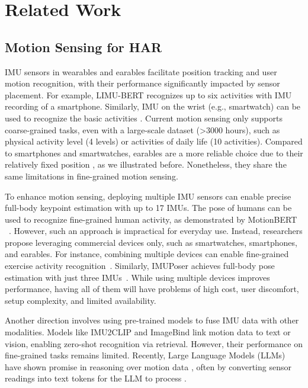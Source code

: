 \section{Related Work}

\label{sec:egolog_related}
\subsection{Motion Sensing for HAR}
IMU sensors in wearables and earables facilitate position tracking and user motion recognition, with their performance significantly impacted by sensor placement.
For example, LIMU-BERT \citep{xu2021limu} recognizes up to six activities with IMU recording of a smartphone.
Similarly, IMU on the wrist (e.g., smartwatch) can be used to recognize the basic activities \citep{chan2024capture}. 
Current motion sensing \citep{chan2024capture} only supports coarse-grained tasks, even with a large-scale dataset (>3000 hours), such as physical activity level (4 levels) or activities of daily life (10 activities).
Compared to smartphones and smartwatches, earables are a more reliable choice due to their relatively fixed position \citep{lyu2024earda, han2023headmon, han2023headsense, han2025headmon+}, as we illustrated before. Nonetheless, they share the same limitations in fine-grained motion sensing.

To enhance motion sensing, deploying multiple IMU sensors can enable precise full-body keypoint estimation with up to 17 IMUs. 
The pose of humans can be used to recognize fine-grained human activity, as demonstrated by MotionBERT ~\citep{zhu2023motionbert}. However, such an approach is impractical for everyday use. Instead, researchers propose leveraging commercial devices only, such as smartwatches, smartphones, and earables. For instance, combining multiple devices can enable fine-grained exercise activity recognition~\citep{stromback2020mm}. Similarly, IMUPoser achieves full-body pose estimation with just three IMUs~\citep{mollyn2023imuposer}. While using multiple devices improves performance, having all of them will have problems of high cost, user discomfort, setup complexity, and limited availability.

Another direction involves using pre-trained models to fuse IMU data with other modalities. Models like IMU2CLIP \citep{moon2023imu2clip} and ImageBind \citep{girdhar2023imagebind} link motion data to text or vision, enabling zero-shot recognition via retrieval. However, their performance on fine-grained tasks remains limited. Recently, Large Language Models (LLMs) have shown promise in reasoning over motion data \citep{ji2024hargpt, leng2024imugpt, xu2024autolife, ouyang2024llmsense}, often by converting sensor readings into text tokens for the LLM to process \citep{xu2024penetrative}.


